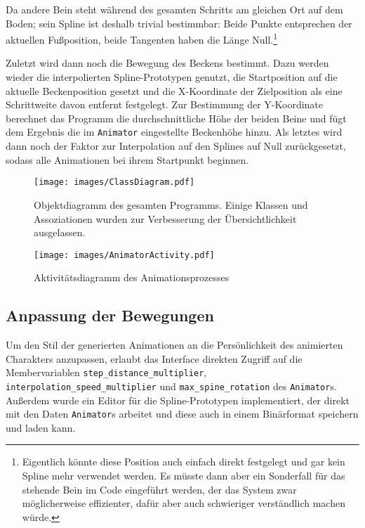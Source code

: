 Da andere Bein steht während des gesamten Schritts am gleichen Ort auf dem Boden; sein Spline ist deshalb trivial bestimmbar: Beide Punkte entsprechen der aktuellen Fußposition, beide Tangenten haben die Länge Null.\footnote{Eigentlich könnte diese Position auch einfach direkt festgelegt und gar kein Spline mehr verwendet werden. Es müsste dann aber ein Sonderfall für das stehende Bein im Code eingeführt werden, der das System zwar möglicherweise effizienter, dafür aber auch schwieriger verständlich machen würde.}

Zuletzt wird dann noch die Bewegung des Beckens bestimmt. Dazu werden wieder die interpolierten Spline-Prototypen genutzt, die Startposition auf die aktuelle Beckenposition gesetzt und die X-Koordinate der Zielposition als eine Schrittweite davon entfernt festgelegt. Zur Bestimmung der Y-Koordinate berechnet das Programm die durchschnittliche Höhe der beiden Beine und fügt dem Ergebnis die im \lstinline{Animator} eingestellte Beckenhöhe hinzu. Als letztes wird dann noch der Faktor zur Interpolation auf den Splines auf Null zurückgesetzt, sodass alle Animationen bei ihrem Startpunkt beginnen.

\begin{landscape}
    \begin{figure}
        \texttt{[image: images/ClassDiagram.pdf]}
        \caption{Objektdiagramm des gesamten Programms. Einige Klassen und Assoziationen wurden zur Verbesserung der Übersichtlichkeit ausgelassen.}
        \label{uml_classes}
    \end{figure}
\end{landscape}

\begin{figure}
    \centering
    \texttt{[image: images/AnimatorActivity.pdf]}
    \caption{Aktivitätsdiagramm des Animationsprozesses}
    \label{uml_activity}
\end{figure}

\subsection{Anpassung der Bewegungen}
Um den Stil der generierten Animationen an die Persönlichkeit des animierten Charakters anzupassen, erlaubt das Interface direkten Zugriff auf die Membervariablen \lstinline{step_distance_multiplier}, \lstinline{interpolation_speed_multiplier} und \lstinline{max_spine_rotation} des \lstinline{Animator}s. Außerdem wurde ein Editor für die Spline-Prototypen implementiert, der direkt mit den Daten \lstinline{Animator}s arbeitet und diese auch in einem Binärformat speichern und laden kann.